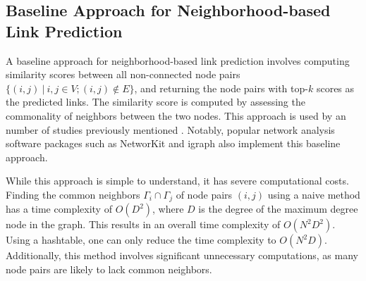 \subsection{Baseline Approach for Neighborhood-based Link Prediction}

A baseline approach for neighborhood-based link prediction involves computing similarity scores between all non-connected node pairs $\{(i, j)\ |\ i, j \in V; (i, j) \notin E\}$, and returning the node pairs with top-$k$ scores as the predicted links. The similarity score is computed by assessing the commonality of neighbors between the two nodes. This approach is used by an number of studies previously mentioned \cite{gatadi2023lpcd, saifi2023fast, benhidour2022approach, mumin2022efficient, rafiee2020cndp, guo2019node, yang2015new, papadimitriou2012fast, wang2019link}. Notably, popular network analysis software packages such as NetworKit \cite{staudt2016networkit} and igraph \cite{csardi2006igraph} also implement this baseline approach.

While this approach is simple to understand, it has severe computational costs. Finding the common neighbors $\Gamma_i \cap \Gamma_j$ of node pairs $(i, j)$ using a naive method has a time complexity of $O(D^2)$, where $D$ is the degree of the maximum degree node in the graph. This results in an overall time complexity of $O(N^2D^2)$. Using a hashtable, one can only reduce the time complexity to $O(N^2D)$. Additionally, this method involves significant unnecessary computations, as many node pairs are likely to lack common neighbors.
